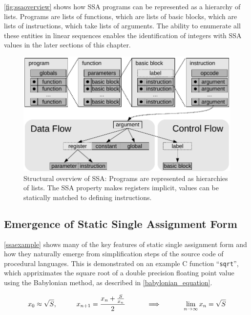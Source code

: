     \autoref{fig:ssaoverview} shows how SSA programs can be represented as a
    hierarchy of lists.
    Programs are lists of functions, which are lists of basic blocks, which are
    lists of instructions, which take lists of arguments.
    The ability to enumerate all these entities in linear sequences enables the
    identification of integers with SSA values in the later sections of this
    chapter.

\begin{figure}[h]
\centering
\includegraphics[width=\textwidth]{figures/ssaoverview}
\caption{Structural overview of SSA: Programs are represented as hierarchies of
    lists. The SSA property makes registers implicit, values can be statically
    matched to defining instructions.}
\label{fig:ssaoverview}
\end{figure}

\subsection{Emergence of Static Single Assignment Form}

    \autoref{ssaexample} shows many of the key features of static single
    assignment form and how they naturally emerge from simplification steps of
    the source code of procedural languages.
    This is demonstrated on an example C function ``{\tt sqrt}'',
    which  appriximates the square root of a double precision floating point
    value using the Babylonian method, as described in
    \autoref{babylonian_equation}.

\begin{equation}
    x_0\approx\sqrt{S},\text{\hspace{1cm}}
    x_{n+1}=\frac{x_n+\frac{S}{x_n}}{2}\text{\hspace{1cm}}
    \implies\text{\hspace{1cm}}
    \lim_{n\rightarrow\infty}x_n=\sqrt{S}
    \label{babylonian_equation}
\end{equation}


